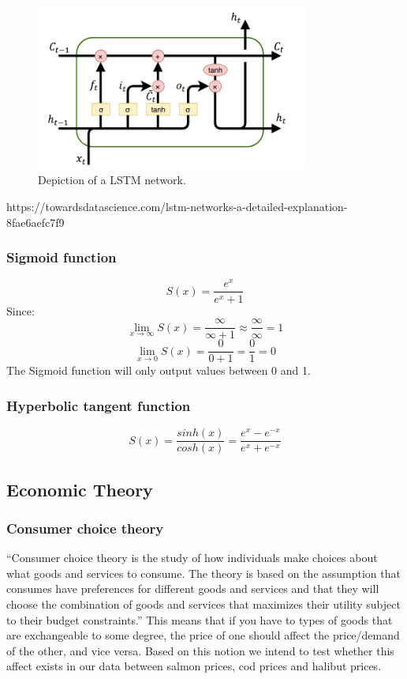 \begin{figure}[H]
    \centering
    \includegraphics[width=0.8\textwidth]{data/Figures/Neural networks/lstm.png}
    \caption[Long Short-Term Memory network]{Depiction of a LSTM network.~\cite{dolphin_2021}}\label{fig:LSTM}
\end{figure}

https://towardsdatascience.com/lstm-networks-a-detailed-explanation-8fae6aefc7f9
\subsubsection{Sigmoid function}
\begin{equation}
    S(x) = \frac{e^x}{e^x+1}
\end{equation}
Since: 
\begin{equation}
    \lim_{x \to \infty}S(x) = \frac{\infty}{\infty+1} \approx \frac{\infty}{\infty} = 1
\end{equation}
\begin{equation}
    \lim_{x \to 0}S(x) = \frac{0}{0+1} = \frac{0}{1} = 0
\end{equation}
The Sigmoid function will only output values between 0 and 1. 
\subsubsection{Hyperbolic tangent function}
\begin{equation}
    S(x) = \frac{sinh(x)}{cosh(x)} = \frac{e^x-e^{-x}}{e^x+e^{-x}}
\end{equation}

\subsection{Economic Theory}
\subsubsection{Consumer choice theory}
``Consumer choice theory is the study of how individuals make choices about what goods and services to consume. The theory is based on the assumption that consumes have preferences for different goods and services and that they will choose the combination of goods and services that maximizes their utility subject to their budget constraints.'' \parencite{Perloff_2017} This means that if you have to types of goods that are exchangeable to some degree, the price of one should affect the price/demand of the other, and vice versa. Based on this notion we intend to test whether this affect exists in our data between salmon prices, cod prices and halibut prices.